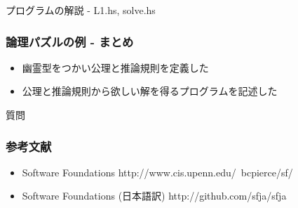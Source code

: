 \documentclass[cjk,dvipdfm,14pt]{beamer}
\begin{document}
\begin{frame}[fragile]
プログラムの解説 - L1.hs, solve.hs
\end{frame}

\begin{frame}[fragile]
\frametitle{論理パズルの例 - まとめ}

\begin{itemize}
\item 幽霊型をつかい公理と推論規則を定義した
\item 公理と推論規則から欲しい解を得るプログラムを記述した
\end{itemize}

\end{frame}

\begin{frame}[fragile]
質問
\end{frame}

\begin{frame}[fragile]
\frametitle{参考文献}

\begin{itemize}
\item Software Foundations http://www.cis.upenn.edu/~bcpierce/sf/
\item Software Foundations (日本語訳) http://github.com/sfja/sfja
\end{itemize}

\end{frame}


\end{document}
